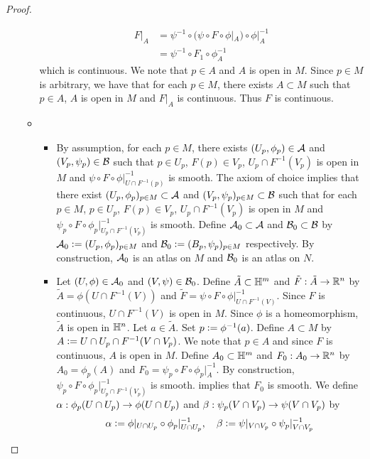 \documentclass{book}
\begin{document}
\begin{proof}
\begin{enumerate}
\begin{itemize}
			\begin{align*}
				F|_A
				& = \psi^{-1} \circ (\psi \circ F \circ \phi|_A ) \circ \phi|_A^{-1} \\
				& = \psi^{-1} \circ F_1 \circ \phi_{A}^{-1} 
			\end{align*}
			which is continuous. We note that $p \in A$ and $A$ is open in $M$. Since $p \in M$ is arbitrary, we have that for each $p \in M$, there exists $A \subset M$ such that $p \in A$, $A$ is open in $M$ and $F|_A$ is continuous. Thus $F$ is continuous.  
			\item 
			\begin{itemize}
				\item By assumption, for each $p \in M$, there exists $(U_p, \phi_p) \in \mathcal{A}$ and $(V_p, \psi_p) \in \mathcal{B}$ such that $p \in U_p$, $F(p) \in V_p$, $U_p \cap F^{-1}(V_p)$ is open in $M$ and $\psi \circ F \circ \phi|_{U \cap F^{-1}(p)}^{-1}$ is smooth. The axiom of choice implies that there exist $(U_p, \phi_p)_{p \in M} \subset \mathcal{A}$ and $(V_p, \psi_p)_{p \in M} \subset \mathcal{B}$ such that for each $p \in M$, $p \in U_p$, $F(p) \in V_p$, $U_p \cap F^{-1}(V_p)$ is open in $M$ and $\psi_p \circ F \circ \phi_p|_{U_p \cap F^{-1}(V_p)}^{-1}$ is smooth. Define $\mathcal{A}_0 \subset \mathcal{A}$ and $\mathcal{B}_0 \subset \mathcal{B}$ by $\mathcal{A}_0 \vcentcolon= (U_p, \phi_p)_{p \in M}$ and $\mathcal{B}_0 \vcentcolon= (B_p, \psi_p)_{p \in M}$ respectively. By construction, $\mathcal{A}_0$ is an atlas on $M$ and $\mathcal{B}_0$ is an atlas on $N$.
				\item Let $(U, \phi) \in \mathcal{A}_0$ and $(V, \psi) \in \mathcal{B}_0$. Define $\tilde{A} \subset \mathbb{H}^m$ and $\tilde{F}: \tilde{A} \rightarrow \mathbb{R}^n$ by $\tilde{A} = \phi(U \cap F^{-1}(V))$ and $\tilde{F} = \psi \circ F \circ \phi|_{U \cap F^{-1}(V)}^{-1}$. Since $F$ is continuous, $U \cap F^{-1}(V)$ is open in $M$. Since $\phi$ is a homeomorphism, $\tilde{A}$ is open in $\mathbb{H}^n$. Let $a \in \tilde{A}$. Set $p \vcentcolon= \phi^{-1}(a)$. Define $A \subset M$ by $A \vcentcolon= U \cap U_p \cap F^{-1}(V \cap V_p)$. We note that $p \in A$ and since $F$ is continuous, $A$ is open in $M$. Define $A_0 \subset \mathbb{H}^m$ and $F_0: A_0 \rightarrow \mathbb{R}^n$ by $A_0 = \phi_p(A)$ and $F_0 = \psi_p \circ F \circ \phi_p|_A^{-1}$. By construction, $\psi_p \circ F \circ \phi_p|_{U_p \cap F^{-1}(V_p)}^{-1}$ is smooth.  implies that $F_0$ is smooth. We define $\alpha: \phi_p(U \cap U_p) \rightarrow \phi(U \cap U_p)$ and $\beta:  \psi_p(V \cap V_p) \rightarrow \psi(V \cap V_p)$ by 
				$$\alpha \vcentcolon= \phi|_{U \cap U_p} \circ \phi_p|_{U \cap U_p}^{-1}, \quad \beta \vcentcolon= \psi|_{V \cap V_p} \circ \psi_p|_{V \cap V_p}^{-1}$$ 

\end{itemize}
\end{itemize}
\end{enumerate}
\end{proof}
\end{document}
